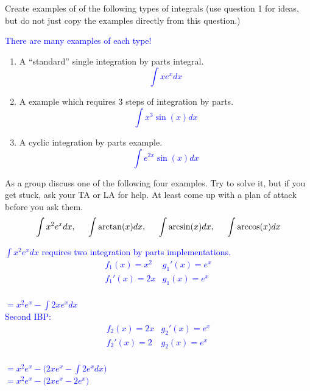 \documentclass{ximera}
\begin{document}
\begin{exercise}
    Create examples of of the following types of integrals (use question 1 for ideas, but do not just copy the examples directly from this question.)
    
       \textcolor{blue} {There are many examples of each type! }
       \begin{enumerate}
        \item A ``standard'' single integration by parts integral.\\
        \textcolor{blue}{$$\int xe^xdx$$}
        
        \item A example which requires 3 steps of integration by parts.\\
        \textcolor{blue} {$$\int x^3\sin(x)dx$$}
       
        \item A cyclic integration by parts example.\\
        \textcolor{blue}{$$\int e^{2x}\sin(x)dx$$}
        
    \end{enumerate}
\end{exercise}

\begin{exercise}
    As a group discuss one of the following four examples.  Try to solve it, but if you get stuck, ask your TA or LA for help.  At least come up with a plan of attack before you ask them. 
\begin{align}
	\int x^2e^x dx,\hspace{.2in}\int \arctan(x)dx, \hspace{.2in}\int \arcsin(x) dx, \hspace{.2in} \int \arccos(x)dx \nonumber
\end{align}
\end{exercise}

\textcolor{blue}{ $\int x^2e^x dx$ requires two integration by parts implementations.\\
\[\begin{array}{c|c}
   f_1(x)=x^2 & g_1'(x)=e^x \\\hline 
   f_1'(x)=2x  & g_1(x)=e^x
\end{array}\]\\
$=x^2e^x-\int2xe^xdx$\\
Second IBP:
\[\begin{array}{c|c}
   f_2(x)=2x  & g_2'(x)=e^x \\\hline 
   f_2'(x)=2  & g_2(x)=e^x
\end{array}\]\\
$=x^2e^x-\big(2xe^x-\int2e^xdx\big)$\\
$=x^2e^x-\big(2xe^x-2e^x\big)$\\
\\}
\end{document}
